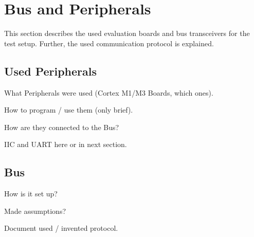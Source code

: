 \chapter{Bus and Peripherals}

This section describes the used evaluation boards and bus transceivers for the test setup. Further, the used communication protocol is explained.

\section{Used Peripherals}

What Peripherals were used (Cortex M1/M3 Boards, which ones).

How to program / use them (only brief).

How are they connected to the Bus?

IIC and UART here or in next section.

\section{Bus}

How is it set up?

Made assumptions?

Document used / invented protocol.

